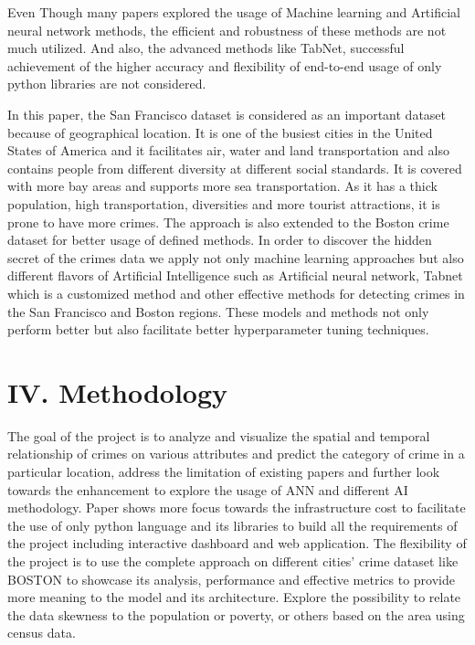 \documentclass[conference,final, 10pt]{IEEEtran}
\begin{document}
Even Though many papers explored the usage of Machine learning and
Artificial neural network methods, the efficient and robustness of these
methods are not much utilized. And also, the advanced methods like
TabNet, successful achievement of the higher accuracy and flexibility of
end-to-end usage of only python libraries are not considered.

In this paper, the San Francisco dataset is considered as an important
dataset because of geographical location. It is one of the busiest
cities in the United States of America and it facilitates air, water and
land transportation and also contains people from different diversity at
different social standards. It is covered with more bay areas and
supports more sea transportation. As it has a thick population, high
transportation, diversities and more tourist attractions, it is prone to
have more crimes. The approach is also extended to the Boston crime
dataset for better usage of defined methods. In order to discover the
hidden secret of the crimes data we apply not only machine learning
approaches but also different flavors of Artificial Intelligence such as
Artificial neural network, Tabnet which is a customized method and other
effective methods for detecting crimes in the San Francisco and Boston
regions. These models and methods not only perform better but also
facilitate better hyperparameter tuning techniques.


\section{IV. Methodology}\label{iv.-methodology}

The goal of the project is to analyze and visualize the spatial and
temporal relationship of crimes on various attributes and predict the
category of crime in a particular location, address the limitation of
existing papers and further look towards the enhancement to explore the
usage of ANN and different AI methodology. Paper shows more focus
towards the infrastructure cost to facilitate the use of only python
language and its libraries to build all the requirements of the project
including interactive dashboard and web application. The flexibility of
the project is to use the complete approach on different cities' crime
dataset like BOSTON to showcase its analysis, performance and effective
metrics to provide more meaning to the model and its architecture.
Explore the possibility to relate the data skewness to the population or
poverty, or others based on the area using census data.
\end{document}
